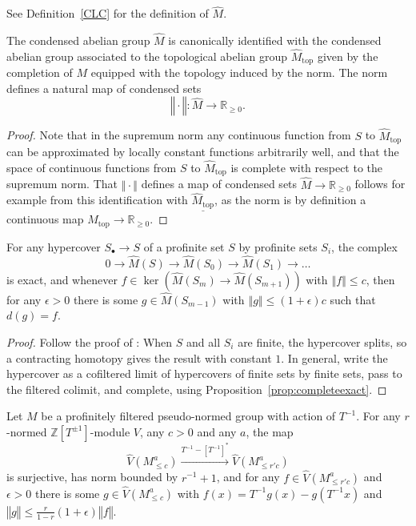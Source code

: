 See Definition~\ref{CLC} for the definition of $\widehat{M}$.

\begin{proposition}
  \label{prop:normedcompletion}
The condensed abelian group $\widehat{M}$ is canonically identified with the condensed abelian group associated to the topological abelian group $\widehat{M}_{\mathrm{top}}$ given by the completion of $M$ equipped with the topology induced by the norm. The norm defines a natural map of condensed sets
\[
‖\cdot‖: \widehat{M}\to \mathbb R_{\geq 0}.
\]
\end{proposition}

\begin{proof}
Note that in the supremum norm any continuous function from $S$ to $\widehat{M}_{\mathrm{top}}$ can be approximated by locally constant functions arbitrarily well, and that the space of continuous functions from $S$ to $\widehat{M}_{\mathrm{top}}$ is complete with respect to the supremum norm. That $‖\cdot‖$ defines a map of condensed sets $\widehat{M}\to \mathbb R_{\geq 0}$ follows for example from this identification with $\underline{\widehat{M}_{\mathrm{top}}}$, as the norm is by definition a continuous map $\widehat{M}_{\mathrm{top}}\to \mathbb R_{\geq 0}$.
\end{proof}

\begin{proposition}
  \label{hypercover-exact}
For any hypercover $S_\bullet\to S$ of a profinite set $S$ by profinite sets $S_i$, the complex
\[
0\to \widehat{M}(S)\to \widehat{M}(S_0)\to \widehat{M}(S_1)\to \ldots
\]
is exact, and whenever $f\in \ker(\widehat{M}(S_m)\to \widehat{M}(S_{m+1}))$ with $‖f‖\leq c$, then for any $\epsilon>0$ there is some $g\in \widehat{M}(S_{m-1})$ with $‖g‖\leq (1+\epsilon)c$ such that $d(g)=f$.
\end{proposition}

\begin{proof}
Follow the proof of \cite[Theorem 3.3]{Condensed}: When $S$ and all $S_i$ are finite, the hypercover splits, so a contracting homotopy gives the result with constant $1$. In general, write the hypercover as a cofiltered limit of hypercovers of finite sets by finite sets, pass to the filtered colimit, and complete, using Proposition~\ref{prop:completeexact}.
\end{proof}

\begin{lemma}
  \label{lem:Tinv}
  Let $M$ be a profinitely filtered pseudo-normed group with action of $T^{-1}$.
  For any $r$-normed $\mathbb Z[T^{\pm 1}]$-module $V$, any $c>0$ and any $a$, the map
\[
\widehat{V}(M_{\leq c}^a)\xrightarrow{T^{-1}-[T^{-1}]^\ast} \widehat{V}(M_{\leq r'c}^a)
\]
is surjective, has norm bounded by $r^{-1}+1$, and for any $f\in \widehat{V}(M_{\leq r'c}^a)$ and $\epsilon>0$ there is some $g\in \widehat{V}(M_{\leq c}^a)$ with $f(x)=T^{-1}g(x)-g(T^{-1}x)$ and $‖g‖\leq \frac{r}{1-r}(1+\epsilon) ‖f‖$.
\end{lemma}

